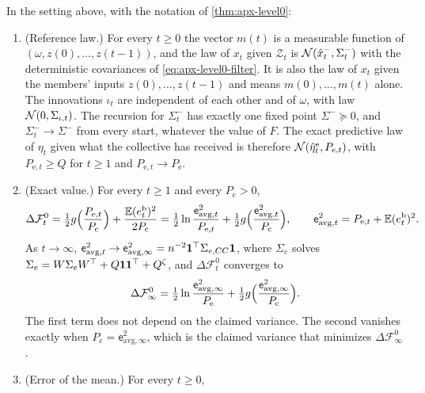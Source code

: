 \begin{proposition}\label{prop:apx-level0-belief}
In the setting above, with the notation of \cref{thm:apx-level0}:
\begin{enumerate}
\item[(a)] (Reference law.) For every $t\ge0$ the vector $m(t)$ is a measurable function of $(\omega,z(0),\dots,z(t-1))$, and the law of $x_t$ given $\mathcal Z_t$ is $\mathcal{N}(\hat x^-_t,\Sigma^-_t)$ with the deterministic covariances of \eqref{eq:apx-level0-filter}. It is also the law of $x_t$ given the members' inputs $z(0),\dots,z(t-1)$ and means $m(0),\dots,m(t)$ alone. The innovations $\iota_t$ are independent of each other and of $\omega$, with law $\mathcal{N}(0,\Sigma_{\iota,t})$. The recursion for $\Sigma^-_t$ has exactly one fixed point $\Sigma^-\succeq0$, and $\Sigma^-_t\to\Sigma^-$ from every start, whatever the value of $F$. The exact predictive law of $\eta_t$ given what the collective has received is therefore $\mathcal{N}(\hat\eta^{\mathrm e}_t,P_{\mathrm e,t})$, with $P_{\mathrm e,t}\ge Q$ for $t\ge1$ and $P_{\mathrm e,t}\to P_{\mathrm e}$.
\item[(b)] (Exact value.) For every $t\ge1$ and every $P_{\mathrm c}>0$,
\begin{equation}\label{eq:apx-level0-belief-exact}
\Delta\mathcal F^0_t=\tfrac12g\Bigl(\frac{P_{\mathrm e,t}}{P_{\mathrm c}}\Bigr)+\frac{\mathbb{E}(e^{\mathrm b}_t)^2}{2P_{\mathrm c}}=\tfrac12\ln\frac{\mathsf e_{\mathrm{avg},t}^2}{P_{\mathrm e,t}}+\tfrac12g\Bigl(\frac{\mathsf e_{\mathrm{avg},t}^2}{P_{\mathrm c}}\Bigr),\qquad\mathsf e_{\mathrm{avg},t}^2=P_{\mathrm e,t}+\mathbb{E}(e^{\mathrm b}_t)^2 .
\end{equation}
As $t\to\infty$, $\mathsf e_{\mathrm{avg},t}^2\to\mathsf e_{\mathrm{avg},\infty}^2=n^{-2}\mathbf{1}^\top\Sigma_{e,CC}\mathbf{1}$, where $\Sigma_e$ solves $\Sigma_e=W\Sigma_eW^\top+Q\mathbf{1}\mathbf{1}^\top+Q^\zeta$, and $\Delta\mathcal F^0_t$ converges to
\begin{equation}\label{eq:apx-level0-belief-limit}
\Delta\mathcal F^0_\infty=\tfrac12\ln\frac{\mathsf e_{\mathrm{avg},\infty}^2}{P_{\mathrm e}}+\tfrac12g\Bigl(\frac{\mathsf e_{\mathrm{avg},\infty}^2}{P_{\mathrm c}}\Bigr).
\end{equation}
The first term does not depend on the claimed variance. The second vanishes exactly when $P_{\mathrm c}=\mathsf e_{\mathrm{avg},\infty}^2$, which is the claimed variance that minimizes $\Delta\mathcal F^0_\infty$.
\item[(c)] (Error of the mean.) For every $t\ge0$,

\end{enumerate}
\end{proposition}
